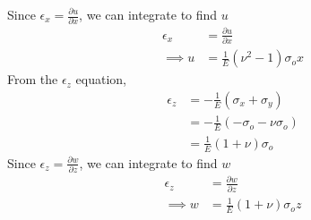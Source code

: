 Since $\epsilon_x = \frac{\partial u}{\partial x}$, we can integrate to find $u$
\begin{align*}
    \epsilon_x &= \frac{\partial u}{\partial x} \\
    \implies u &= \boxed{\frac{1}{E} \left( \nu^2 - 1 \right) \sigma_o x}
\end{align*}
From the $\epsilon_z$ equation,
\begin{align*}
    \epsilon_z &= -\frac{1}{E} \left( \sigma_x + \sigma_y \right) \\
    &= -\frac{1}{E} \left( -\sigma_o - \nu \sigma_o \right) \\
    &= \frac{1}{E} \left(1 + \nu \right) \sigma_o
\end{align*}
Since $\epsilon_z = \frac{\partial w}{\partial z}$, we can integrate to find $w$
\begin{align*}
    \epsilon_z &= \frac{\partial w}{\partial z} \\
    \implies w &= \boxed{\frac{1}{E} \left(1 + \nu \right) \sigma_o z}
\end{align*}

